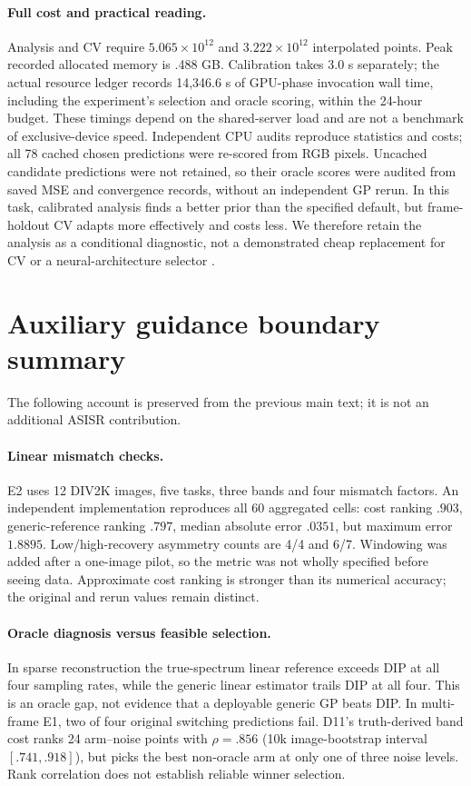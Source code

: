 \paragraph{Full cost and practical reading.} Analysis and CV require
$5.065\times10^{12}$ and $3.222\times10^{12}$ interpolated points. Peak
recorded allocated memory is .488 GB. Calibration takes 3.0 s separately;
the actual resource ledger records 14,346.6 s of GPU-phase invocation wall
time, including the experiment's selection and oracle scoring, within the
24-hour budget. These timings depend on the shared-server load and are
not a benchmark of exclusive-device speed. Independent CPU audits reproduce
statistics and costs; all 78 cached chosen predictions were re-scored
from RGB pixels. Uncached candidate predictions were not retained, so
their oracle scores were audited from saved MSE and convergence records,
without an independent GP rerun. In this task, calibrated analysis finds
a better prior than the specified default, but frame-holdout CV adapts
more effectively and costs less. We therefore retain the analysis as a
conditional diagnostic, not a demonstrated cheap replacement for CV or
a neural-architecture selector .

\section{Auxiliary guidance boundary summary}\label{app:guidance-summary}
The following account is preserved from the previous main text; it is not an additional ASISR contribution.
\paragraph{Linear mismatch checks.} E2 uses 12 DIV2K images, five tasks, three bands and four mismatch factors. An independent implementation reproduces all 60 aggregated cells: cost ranking $.903$, generic-reference ranking $.797$, median absolute error $.0351$, but maximum error $1.8895$. Low/high-recovery asymmetry counts are 4/4 and 6/7. Windowing was added after a one-image pilot, so the metric was not wholly specified before seeing data. Approximate cost ranking is stronger than its numerical accuracy; the original and rerun values remain distinct.

\paragraph{Oracle diagnosis versus feasible selection.} In sparse reconstruction the true-spectrum linear reference exceeds DIP at all four sampling rates, while the generic linear estimator trails DIP at all four. This is an oracle gap, not evidence that a deployable generic GP beats DIP. In multi-frame E1, two of four original switching predictions fail. D11's truth-derived band cost ranks 24 arm--noise points with $\rho=.856$ (10k image-bootstrap interval $[.741,.918]$), but picks the best non-oracle arm at only one of three noise levels. Rank correlation does not establish reliable winner selection.

